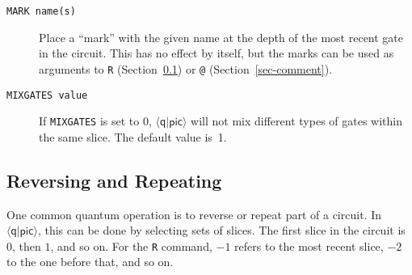 \documentclass[twoside,12pt]{article}
\newcommand{\qpic}{$\langle\mathsf{q}|\mathsf{pic}\rangle$\xspace}
\begin{document}
\begin{description}
\item[{\tt MARK name(s)}] Place a ``mark'' with the given name at the depth of the
  most recent gate in the circuit.  This has no effect by itself, but the marks can be
  used as arguments to {\tt R} (Section~\ref{sec-qpic-R}) or {\tt @}
  (Section~\ref{sec-comment}).

\item[{\tt MIXGATES value}] If {\tt MIXGATES} is set to $0$, \qpic will not mix different types of gates within the
same slice.  The default value is~1.

\begin{minipage}[b]{2in}

\end{minipage} \hfill 
\end{description}

\subsection{Reversing and Repeating}
\label{sec-qpic-R}

One common quantum operation is to reverse or repeat part of a circuit.  In \qpic, this can be done by
selecting sets of slices.  The first slice in the circuit is $0$, then $1$, and so on.  For
the {\tt R} command, $-1$ refers to the most recent slice, $-2$ to the one before that, and so on.
\end{document}

